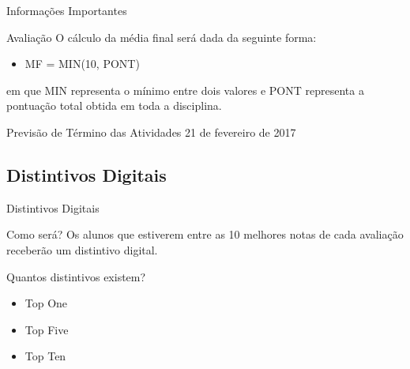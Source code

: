 \documentclass[xcolor=dvipsnames,table]{beamer}
\begin{document}
	\begin{frame}{Informações Importantes}
		\begin{block}{Avaliação}
			O cálculo da média final será dada da seguinte forma:
			\begin{itemize}
				\item MF = MIN(10, PONT)
			\end{itemize}
			em que MIN representa o mínimo entre dois valores e PONT representa a pontuação total obtida em toda a disciplina.
		\end{block} \pause
		\begin{exampleblock}{Previsão de Término das Atividades}
			21 de fevereiro de 2017
		\end{exampleblock}
	\end{frame}
	
	\subsection{Distintivos Digitais}
	\begin{frame}{Distintivos Digitais}
		\begin{block}{Como será?}
			Os alunos que estiverem entre as 10 melhores notas de cada avaliação receberão um distintivo digital.
		\end{block} \pause
		\begin{block}{Quantos distintivos existem?}
			\begin{itemize}
				\item {\sc Top One}
				\item {\sc Top Five}
				\item {\sc Top Ten}
			\end{itemize}
		\end{block}
	\end{frame}
	
\end{document}
